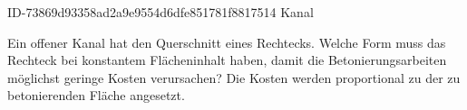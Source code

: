 \begin{exercise}
      {ID-73869d93358ad2a9e9554d6dfe851781f8817514}
      {Kanal}
  \ifproblem\problem\par
    Ein offener Kanal hat den Querschnitt eines Rechtecks. Welche Form muss das
    Rechteck bei konstantem Flächeninhalt haben, damit die Betonierungsarbeiten
    möglichst geringe Kosten verursachen? Die Kosten werden proportional zu der
    zu betonierenden Fläche angesetzt.
  \fi
\end{exercise}
